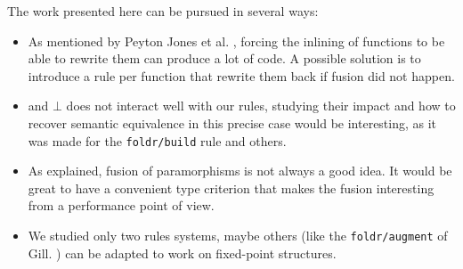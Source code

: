 
The work presented here can be pursued in several ways: 
\begin{itemize}
\item As mentioned by Peyton Jones et al. \cite{pbr}, forcing the inlining of functions to be able to rewrite them can produce a lot of code. A possible solution is to introduce a rule per function that rewrite them back if fusion did not happen.

\item {} and $\bot$ does not interact well with our rules, studying their impact and how to recover semantic equivalence in this precise case would be interesting, as it was made for the \verb|foldr/build| rule and others.

\item As explained, fusion of paramorphisms is not always a good idea. It would be great to have a convenient type criterion that makes the fusion interesting from a performance point of view.

\item We studied only two rules systems, maybe others (like the \verb|foldr/augment| of Gill. \cite{Gill1996CheapDF}) can be adapted to work on fixed-point structures.
\end{itemize}